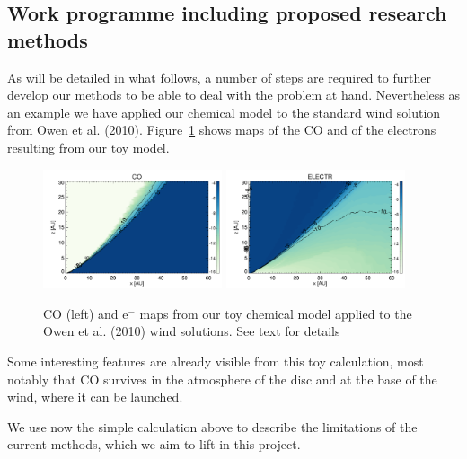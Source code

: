 \documentclass[10pt,fleqn,twoside]{article}
\newcommand{\Tcol}{\color{blue}}
\begin{document}
\subsection{\Tcol Work programme including proposed research methods}

As will be detailed in what follows, a number of steps are required to
further develop our methods to be able to deal with the problem at
hand. Nevertheless as an example we have applied our chemical model to
the standard wind solution from Owen et
al. (2010). Figure~\ref{fig:chem} shows maps of the CO and of the
electrons resulting from our toy model. 

 \begin{figure}
   \centering
   \includegraphics[width=0.47\textwidth]{Lx_2e29_CO.pdf}
   \includegraphics[width=0.47\textwidth]{Lx_2e29_ELECTR.pdf}
   \caption{CO (left) and e$^-$ maps from our toy chemical model
     applied to the Owen et al. (2010) wind solutions. See text for details
}
              \label{fig:chem}%
    \end{figure}

Some interesting features are already visible from this toy
calculation, most notably that CO survives in the atmosphere of the
disc and at the base of the wind, where it can be launched. 

We use now the simple calculation above to describe the limitations of
the current methods, which we aim to lift in this project. 
\end{document}
